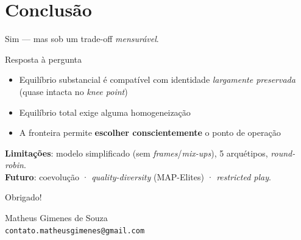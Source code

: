 \documentclass[11pt,aspectratio=169]{beamer}
\begin{document}
\section{Conclusão}

\begin{frame}[standout]
  Sim --- mas sob um trade-off \emph{mensurável}.
\end{frame}

\begin{frame}{Resposta à pergunta}
  \begin{itemize}
    \item Equilíbrio \alert{substancial} é compatível com identidade
          \emph{largamente preservada} (quase intacta no \emph{knee point})
    \item Equilíbrio \alert{total} exige alguma homogeneização
    \item A fronteira permite \textbf{escolher conscientemente} o ponto de operação
  \end{itemize}

  \vfill
  \footnotesize
  \textbf{Limitações}: modelo simplificado (sem \emph{frames}/\emph{mix-ups}),
  5 arquétipos, \emph{round-robin}.\\
  \textbf{Futuro}: coevolução · \emph{quality-diversity} (MAP-Elites) ·
  \emph{restricted play}.
\end{frame}

\begin{frame}[standout]
  Obrigado!

  \vfill
  \small
  Matheus Gimenes de Souza\\
  \texttt{contato.matheusgimenes@gmail.com}
\end{frame}
\end{document}
